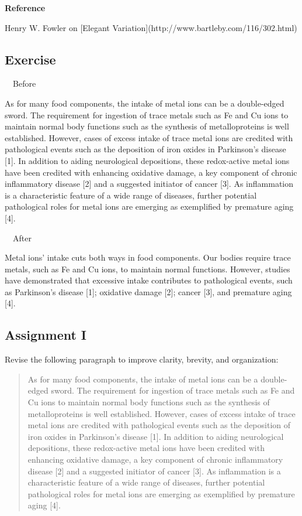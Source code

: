 \documentclass[a4paper, 12pt]{article}
\begin{document}
\textbf{Reference}
\par Henry W. Fowler on [Elegant Variation](http://www.bartleby.com/116/302.html)

\newpage\subsection{Exercise}

\par\ \textbullet\ Before
\par As for many food components, the intake of metal ions can be a double-edged sword.
The requirement for ingestion of trace metals such as Fe and Cu ions to maintain normal body functions such as the synthesis of metalloproteins is well established.
However, cases of excess intake of trace metal ions are credited with pathological events such as the deposition of iron oxides in Parkinson's disease [1].
In addition to aiding neurological depositions, these redox-active metal ions have been credited with enhancing oxidative damage,
a key component of chronic inflammatory disease [2] and a suggested initiator of cancer [3]. As inflammation is a characteristic feature of a wide range of diseases,
further potential pathological roles for metal ions are emerging as exemplified by premature aging [4].

\par\ \textbullet\ After
\par Metal ions' intake cuts both ways in food components.
Our bodies require trace metals, such as Fe and Cu ions, to maintain normal functions.
However, studies have demonstrated that excessive intake contributes to pathological events,
such as Parkinson's disease [1]; oxidative damage [2]; cancer [3], and premature aging [4].

\newpage\subsection{Assignment I}

\par Revise the following paragraph to improve clarity, brevity, and organization:

\vspace{4pt}\begin{quote}
As for many food components, the intake of metal ions can be a double-edged sword. 
The requirement for ingestion of trace metals such as Fe and Cu ions to maintain normal body functions such as the synthesis of metalloproteins is well established.
However, cases of excess intake of trace metal ions are credited with pathological events such as the deposition of iron oxides in Parkinson's disease [1].
In addition to aiding neurological depositions, these redox-active metal ions have been credited with enhancing oxidative damage,
a key component of chronic inflammatory disease [2] and a suggested initiator of cancer [3]. As inflammation is a characteristic feature of a wide range of diseases,
further potential pathological roles for metal ions are emerging as exemplified by premature aging [4].  
\end{quote}
\end{document}
